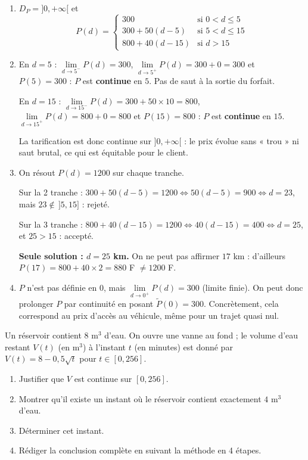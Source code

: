 \documentclass[11pt]{article}
\begin{document}
\begin{corrige}
\begin{enumerate}
\item $D_P = ]0,+\infty[$ et
\[
P(d)=\begin{cases}
300 & \text{si } 0<d\le 5\\
300+50(d-5) & \text{si } 5<d\le 15\\
800+40(d-15) & \text{si } d>15
\end{cases}
\]
\item En $d=5$ : $\lim\limits_{d\to 5^-}P(d)=300$, $\lim\limits_{d\to 5^+}P(d)=300+0=300$ et $P(5)=300$ : $P$ est \textbf{continue} en $5$. Pas de saut à la sortie du forfait.

En $d=15$ : $\lim\limits_{d\to 15^-}P(d)=300+50\times10=800$, $\lim\limits_{d\to 15^+}P(d)=800+0=800$ et $P(15)=800$ : $P$ est \textbf{continue} en $15$.

La tarification est donc continue sur $]0,+\infty[$ : le prix évolue sans « trou » ni saut brutal, ce qui est équitable pour le client.
\item On résout $P(d)=1200$ sur chaque tranche.

Sur la 2 tranche : $300+50(d-5)=1200 \iff 50(d-5)=900 \iff d=23$, mais $23\notin\,]5,15]$ : rejeté.

Sur la 3 tranche : $800+40(d-15)=1200 \iff 40(d-15)=400 \iff d=25$, et $25>15$ : accepté.

\textbf{Seule solution : $d=25$ km.} On ne peut pas affirmer $17$ km : d'ailleurs $P(17)=800+40\times2=880$ F $\neq 1200$ F.
\item $P$ n'est pas définie en $0$, mais $\lim\limits_{d\to 0^+}P(d)=300$ (limite finie). On peut donc prolonger $P$ par continuité en posant $\tilde P(0)=300$. Concrètement, cela correspond au prix d'accès au véhicule, même pour un trajet quasi nul.
\end{enumerate}
\end{corrige}

\begin{exercice}
Un réservoir contient $8$ m$^3$ d'eau. On ouvre une vanne au fond ; le volume d'eau restant $V(t)$ (en m$^3$) à l'instant $t$ (en minutes) est donné par $V(t)=8-0,5\sqrt{t}$ pour $t\in[0,256]$.
\begin{enumerate}
\item Justifier que $V$ est continue sur $[0,256]$.
\item Montrer qu'il existe un instant où le réservoir contient exactement $4$ m$^3$ d'eau.
\item Déterminer cet instant.
\item Rédiger la conclusion complète en suivant la méthode en 4 étapes.
\end{enumerate}
\end{exercice}
\end{document}
